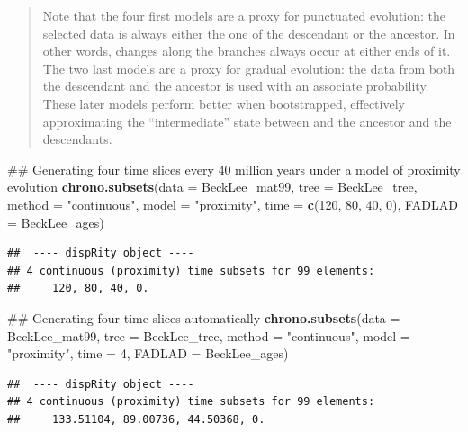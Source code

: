 \documentclass[]{book}
\newenvironment{Shaded}{\begin{snugshade}}{\end{snugshade}}
\newcommand{\KeywordTok}[1]{\textcolor[rgb]{0.13,0.29,0.53}{\textbf{#1}}}
\newcommand{\DataTypeTok}[1]{\textcolor[rgb]{0.13,0.29,0.53}{#1}}
\newcommand{\DecValTok}[1]{\textcolor[rgb]{0.00,0.00,0.81}{#1}}
\newcommand{\StringTok}[1]{\textcolor[rgb]{0.31,0.60,0.02}{#1}}
\newcommand{\NormalTok}[1]{#1}
\theoremstyle{definition}
\theoremstyle{definition}
\theoremstyle{definition}
\theoremstyle{remark}
\begin{document}
\begin{quote}
Note that the four first models are a proxy for punctuated evolution:
the selected data is always either the one of the descendant or the
ancestor. In other words, changes along the branches always occur at
either ends of it. The two last models are a proxy for gradual
evolution: the data from both the descendant and the ancestor is used
with an associate probability. These later models perform better when
bootstrapped, effectively approximating the ``intermediate'' state
between and the ancestor and the descendants.
\end{quote}

\begin{Shaded}
\begin{Highlighting}[]
\NormalTok{## Generating four time slices every 40 million years under a model of proximity evolution}
\KeywordTok{chrono.subsets}\NormalTok{(}\DataTypeTok{data =}\NormalTok{ BeckLee_mat99, }\DataTypeTok{tree =}\NormalTok{ BeckLee_tree, }
    \DataTypeTok{method =} \StringTok{"continuous"}\NormalTok{, }\DataTypeTok{model =} \StringTok{"proximity"}\NormalTok{, }\DataTypeTok{time =} \KeywordTok{c}\NormalTok{(}\DecValTok{120}\NormalTok{, }\DecValTok{80}\NormalTok{, }\DecValTok{40}\NormalTok{, }\DecValTok{0}\NormalTok{),}
    \DataTypeTok{FADLAD =}\NormalTok{ BeckLee_ages)}
\end{Highlighting}
\end{Shaded}

\begin{verbatim}
##  ---- dispRity object ---- 
## 4 continuous (proximity) time subsets for 99 elements:
##     120, 80, 40, 0.
\end{verbatim}

\begin{Shaded}
\begin{Highlighting}[]
\NormalTok{## Generating four time slices automatically}
\KeywordTok{chrono.subsets}\NormalTok{(}\DataTypeTok{data =}\NormalTok{ BeckLee_mat99, }\DataTypeTok{tree =}\NormalTok{ BeckLee_tree,}
    \DataTypeTok{method =} \StringTok{"continuous"}\NormalTok{, }\DataTypeTok{model =} \StringTok{"proximity"}\NormalTok{, }\DataTypeTok{time =} \DecValTok{4}\NormalTok{, }\DataTypeTok{FADLAD =}\NormalTok{ BeckLee_ages)}
\end{Highlighting}
\end{Shaded}

\begin{verbatim}
##  ---- dispRity object ---- 
## 4 continuous (proximity) time subsets for 99 elements:
##     133.51104, 89.00736, 44.50368, 0.
\end{verbatim}
\end{document}
